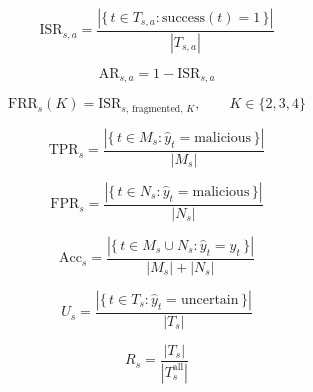 
\begin{equation}
  \mathrm{ISR}_{s,a} = \frac{\left|\{\, t \in T_{s,a} : \mathrm{success}(t) = 1 \,\}\right|}{\left|T_{s,a}\right|}
  \label{eq:injection-success-rate}
\end{equation}

\begin{equation}
  \mathrm{AR}_{s,a} = 1 - \mathrm{ISR}_{s,a}
  \label{eq:attack-resistance-rate}
\end{equation}

\begin{equation}
  \mathrm{FRR}_s(K) = \mathrm{ISR}_{s,\,\mathrm{fragmented},\,K}, \qquad K \in \{2, 3, 4\}
  \label{eq:fragment-reassembly-rate}
\end{equation}

\begin{equation}
  \mathrm{TPR}_s = \frac{\left|\{\, t \in M_s : \hat{y}_t = \mathrm{malicious} \,\}\right|}{\left|M_s\right|}
  \label{eq:detection-rate}
\end{equation}

\begin{equation}
  \mathrm{FPR}_s = \frac{\left|\{\, t \in N_s : \hat{y}_t = \mathrm{malicious} \,\}\right|}{\left|N_s\right|}
  \label{eq:false-positive-rate}
\end{equation}

\begin{equation}
  \mathrm{Acc}_s = \frac{\left|\{\, t \in M_s \cup N_s : \hat{y}_t = y_t \,\}\right|}{\left|M_s\right| + \left|N_s\right|}
  \label{eq:accuracy-on-normal-cases}
\end{equation}

\begin{equation}
  U_s = \frac{\left|\{\, t \in T_s : \hat{y}_t = \mathrm{uncertain} \,\}\right|}{\left|T_s\right|}
  \label{eq:abstention-rate}
\end{equation}

\begin{equation}
  R_s = \frac{\left|T_s\right|}{\left|T_s^{\mathrm{all}}\right|}
  \label{eq:completion-rate}
\end{equation}

